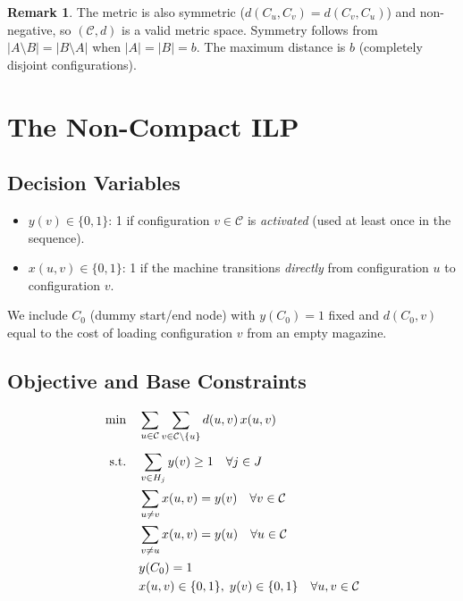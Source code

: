 \documentclass[11pt,a4paper]{article}
\theoremstyle{plain}
\theoremstyle{definition}
\newtheorem{remark}[theorem]{Remark}
\begin{document}
\begin{remark}
The metric is also symmetric ($d(C_u,C_v)=d(C_v,C_u)$) and non-negative,
so $(\mathcal{C}, d)$ is a valid metric space. Symmetry follows from
$|A \setminus B| = |B \setminus A|$ when $|A|=|B|=b$.
The maximum distance is $b$ (completely disjoint configurations).
\end{remark}

\section{The Non-Compact ILP}
\label{sec:nc_ilp}

\subsection{Decision Variables}

\begin{itemize}
\item $y(v) \in \{0,1\}$: 1 if configuration $v \in \mathcal{C}$ is \emph{activated}
      (used at least once in the sequence).
\item $x(u,v) \in \{0,1\}$: 1 if the machine transitions \emph{directly} from
      configuration $u$ to configuration $v$.
\end{itemize}

We include $C_0$ (dummy start/end node) with $y(C_0)=1$ fixed and $d(C_0,v)$
equal to the cost of loading configuration $v$ from an empty magazine.

\subsection{Objective and Base Constraints}

\begin{align}
\min \quad & \sum_{u \in \mathcal{C}} \sum_{v \in \mathcal{C} \setminus \{u\}}
             d(u,v)\, x(u,v) \label{eq:nc_obj}\\[4pt]
\text{s.t.}\quad
& \sum_{v \in H_j} y(v) \ge 1 \quad \forall j \in J
  \label{eq:nc_cover}\\
& \sum_{u \ne v} x(u,v) = y(v) \quad \forall v \in \mathcal{C}
  \label{eq:nc_flowin}\\
& \sum_{v \ne u} x(u,v) = y(u) \quad \forall u \in \mathcal{C}
  \label{eq:nc_flowout}\\
& y(C_0) = 1 \label{eq:nc_depot}\\
& x(u,v) \in \{0,1\},\; y(v) \in \{0,1\} \quad \forall u,v \in \mathcal{C}
  \notag
\end{align}
\end{document}
